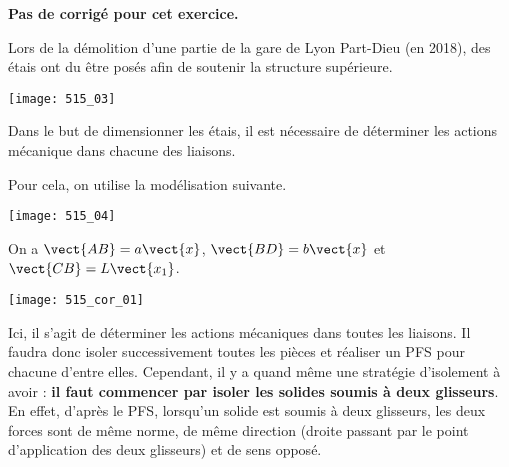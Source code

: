 \normalfalse \difficiletrue \tdifficilefalse
\correctiontrue


\setcounter{question}{0}
\ifcorrection
\else
\textbf{Pas de corrigé pour cet exercice.}
\fi


\ifprof
\else

Lors de la démolition d'une partie de la gare de Lyon Part-Dieu (en 2018), des étais ont du être posés afin de soutenir la structure supérieure. 

\begin{center}
\texttt{[image: 515\_03]}
\end{center}

Dans le but de dimensionner les étais, il est nécessaire de déterminer les actions mécanique dans chacune des liaisons. 

Pour cela, on utilise la modélisation suivante. 

\begin{center}
\texttt{[image: 515\_04]}
\end{center}

On a $\vect{AB}=a \vect{x}$,  $\vect{BD}=b \vect{x}$ et  $\vect{CB}=L \vect{x_1}$.
\fi

\ifprof

\begin{center}
\texttt{[image: 515\_cor\_01]}
\end{center}

\else
\fi

\ifprof

Ici, il s'agit de déterminer les actions mécaniques dans toutes les liaisons. Il faudra donc isoler successivement toutes les pièces et réaliser un PFS pour chacune d'entre elles. Cependant, il y a quand même une stratégie d'isolement à avoir : \textbf{il faut commencer par isoler les solides soumis à deux glisseurs}. En effet, d'après le PFS, lorsqu'un solide est soumis à deux glisseurs, les deux forces sont de même norme, de même direction (droite passant par le point d'application des deux glisseurs) et de sens opposé. 

